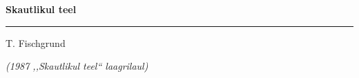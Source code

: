 \documentclass[10pt]{book}
\begin{document}
{
  \samepage
  \raggedbottom
  \raggedright
  \sloppy


  \vspace{0.2in}
    \centerline{
      \bfseries
      \large Skautlikul teel
    }
  \nopagebreak[4]
  \vspace{0.1in}
  \nopagebreak[4]
  \hrule height 0.05ex
  \nopagebreak[4]
  \vspace{-0.05in}

  {\footnotesize  \hfill T. Fischgrund }\\
  \vspace{0.01in}

  {\em {\footnotesize (1987 ,,Skautlikul teel{``} laagrilaul) } }
  \vspace{0.01in}


}
\end{document}
